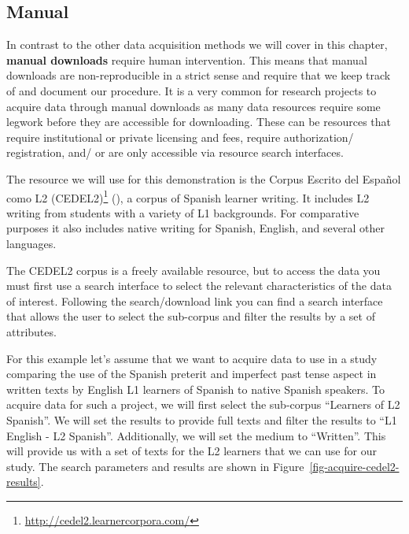 \documentclass[
  letterpaper,
  krantz1]{latex/krantz-mod}
\theoremstyle{definition}
\theoremstyle{definition}
\theoremstyle{remark}
\DeclareRobustCommand{\href}[2]{#2\footnote{\url{#1}}}
\begin{document}
\subsection{Manual}\label{manual}

In contrast to the other data acquisition methods we will cover in this
chapter, \textbf{manual downloads} require human
intervention. This means that manual downloads are non-reproducible in a
strict sense and require that we keep track of and document our
procedure. It is a very common for research projects to acquire data
through manual downloads as many data resources require some legwork
before they are accessible for downloading. These can be resources that
require institutional or private licensing and fees, require
authorization/ registration, and/ or are only accessible via resource
search interfaces.

The resource we will use for this demonstration is the
\href{http://cedel2.learnercorpora.com/}{Corpus Escrito del Español como
L2 (CEDEL2)} (), a corpus of
Spanish learner writing. It includes L2 writing from students with a
variety of L1 backgrounds. For comparative purposes it also includes
native writing for Spanish, English, and several other
languages. 

The CEDEL2 corpus is a freely available resource, but to access the data
you must first use a search interface to select the relevant
characteristics of the data of interest. Following the search/download
link you can find a search interface that allows the user to select the
sub-corpus and filter the results by a set of
attributes.

For this example let's assume that we want to acquire data to use in a
study comparing the use of the Spanish preterit and imperfect past tense
aspect in written texts by English L1 learners of Spanish to native
Spanish speakers. To acquire data for such a project, we will first
select the sub-corpus ``Learners of L2 Spanish''. We will set the
results to provide full texts and filter the results to ``L1 English -
L2 Spanish''. Additionally, we will set the medium to ``Written''. This
will provide us with a set of texts for the L2 learners that we can use
for our study. The search parameters and results are shown in
Figure~\ref{fig-acquire-cedel2-results}.
\end{document}
